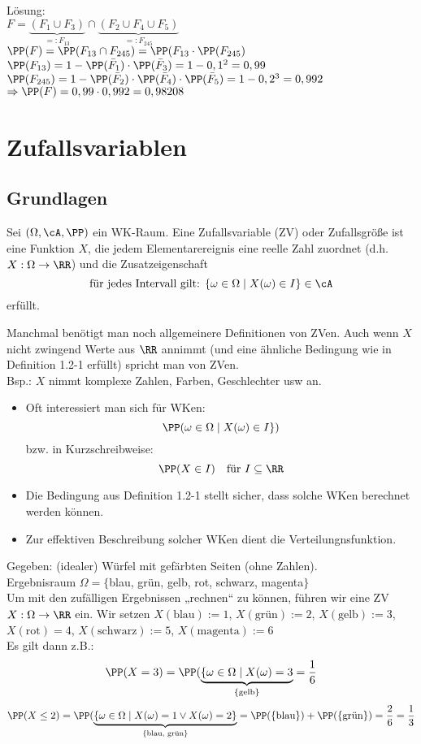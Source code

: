 Lösung:\\
$F=\underbrace{(F_1 \cup F_3)}_{=:F_{13}} \cap \underbrace{(F_2\cup F_4 \cup F_5)}_{=:F_{245}}$\\
$\PP(F) = \PP(F_{13} \cap F_{245} ) = \PP(F_{13} \cdot \PP(F_{245})$\\
$\PP(F_{13})=1-\PP(\bar F_1) \cdot \PP(\bar F_3) = 1- 0,1^2 = 0,99$\\
$\PP(F_{245})=1-\PP(\bar F_2) \cdot \PP(\bar F_4) \cdot \PP(\bar F_5) = 1-0,2^3=0,992$\\
$\Rightarrow \PP(F) = 0,99\cdot 0,992 = 0,98208$

\section{Zufallsvariablen}

\subsection{Grundlagen}

 Sei $(\Omega,  \cA, \PP)$ ein WK-Raum. Eine Zufallsvariable (ZV) oder Zufallsgröße ist eine Funktion $X$, die jedem Elementarereignis eine reelle Zahl zuordnet (d.h. $X: \Omega \to \RR$) und die Zusatzeigenschaft
$$\text{für jedes Intervall gilt: }\{\omega \in \Omega \;|\;  X(\omega) \in I\} \in \cA$$
erfüllt.

 Manchmal benötigt man noch allgemeinere Definitionen von ZVen. Auch wenn $X$ nicht zwingend Werte aus $\RR$ annimmt (und eine ähnliche Bedingung wie in Definition 1.2-1 erfüllt) spricht man von ZVen.\\
Bsp.: $X$ nimmt komplexe Zahlen, Farben, Geschlechter usw an.

\begin{itemize}
\item Oft interessiert man sich für WKen:
$$\PP(\omega \in \Omega \;|\; X(\omega) \in I\})$$
bzw. in Kurzschreibweise:
$$\PP(X\in I) \quad \text{für }I \subseteq \RR$$
\item Die Bedingung aus Definition 1.2-1 stellt sicher, dass solche WKen berechnet werden können.
\item Zur effektiven Beschreibung solcher WKen dient die Verteilungnsfunktion.
\end{itemize}

 Gegeben: (idealer) Würfel mit gefärbten Seiten (ohne Zahlen). \\
Ergebnisraum $\Omega = \{$blau, grün, gelb, rot, schwarz, magenta$\}$\\
Um mit den zufälligen Ergebnissen „rechnen“ zu können, führen wir eine ZV $X: \Omega \to \RR$ ein. Wir setzen $X(\text{blau}):=1$, $X(\text{grün}):=2$, $X(\text{gelb}):=3$, $X(\text{rot})=4$, $X(\text{schwarz}):=5$, $X(\text{magenta}):=6$\\
Es gilt dann z.B.:
$$\PP(X=3) = \PP(\underbrace{\{ \omega \in \Omega \;|\; X(\omega) = 3}_{\{\text{gelb}\}} = \frac{1}{6}$$
$$\PP(X \leq 2) = \PP(\underbrace{\{\omega \in \Omega \;|\; X(\omega) = 1 \vee X(\omega) = 2\}}_{\{\text{blau, grün}\}}=\PP(\{\text{blau}\}) + \PP(\{\text{grün}\}) = \frac{2}{6}=\frac{1}{3}$$

